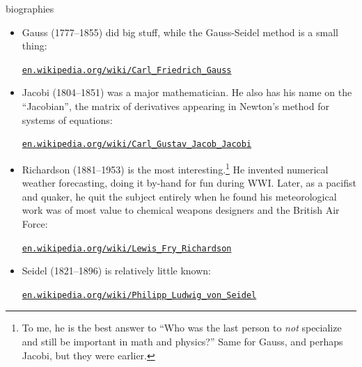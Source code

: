 \documentclass[10pt,hyperref]{beamer}
\begin{document}
\begin{frame}{biographies}

\begin{itemize}
\small
\item Gauss (1777--1855) did big stuff, while the Gauss-Seidel method is a small thing:

    \centerline{\href{https://en.wikipedia.org/wiki/Carl_Friedrich_Gauss}{\texttt{en.wikipedia.org/wiki/Carl\_Friedrich\_Gauss}}}

\medskip
\item Jacobi (1804--1851) was a major mathematician.  He also has his name on the ``Jacobian'', the matrix of derivatives appearing in Newton's method for systems of equations:

    \centerline{\href{https://en.wikipedia.org/wiki/Carl_Gustav_Jacob_Jacobi}{\texttt{en.wikipedia.org/wiki/Carl\_Gustav\_Jacob\_Jacobi}}}

\medskip
\item Richardson (1881--1953) is the most interesting.\footnote{To me, he is the best answer to ``Who was the last person to \emph{not} specialize and still be important in math and physics?''  Same for Gauss, and perhaps Jacobi, but they were earlier.}  He invented numerical weather forecasting, doing it by-hand for fun during WWI.  Later, as a pacifist and quaker, he quit the subject entirely when he found his meteorological work was of most value to chemical weapons designers and the British Air Force:

    \centerline{\href{https://en.wikipedia.org/wiki/Lewis_Fry_Richardson}{\texttt{en.wikipedia.org/wiki/Lewis\_Fry\_Richardson}}}

\medskip
\item Seidel (1821--1896) is relatively little known:

    \centerline{\href{https://en.wikipedia.org/wiki/Philipp_Ludwig_von_Seidel}{\texttt{en.wikipedia.org/wiki/Philipp\_Ludwig\_von\_Seidel}}}
\end{itemize}
\end{frame}
\end{document}
